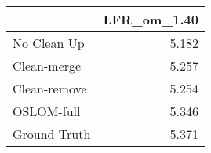 \begin{tabular}{lr}
\toprule
{} & LFR_om_1.40 \\
\midrule
No Clean Up  &       5.182 \\
Clean-merge  &       5.257 \\
Clean-remove &       5.254 \\
OSLOM-full   &       5.346 \\
Ground Truth &       5.371 \\
\bottomrule
\end{tabular}
